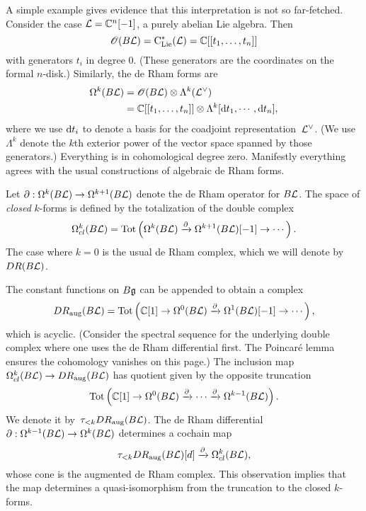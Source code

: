 \begin{eg}
A simple example gives evidence that this interpretation is not so far-fetched.
Consider the case $\mathcal L = \mathbb C^n [-1]$, a purely abelian Lie algebra.
Then
\[
\mathscr O(B \mathcal L) = {\rm C}_{{\rm Lie}}^*(\mathcal L) = \mathbb C[[t_1,\ldots,t_n]]
\]
with generators $t_i$ in degree 0.
(These generators are the coordinates on the formal $n$-disk.)
Similarly, the de Rham forms are
\begin{align*}
\Omega^k(B \mathcal L) 
&= \mathscr O(B \mathcal L)  \otimes \Lambda^k(\mathcal L^\vee) \\
 &=\mathbb C[[t_1,\ldots, t_n]] \otimes \Lambda^k[{\rm d} t_1, \cdots, {\rm d} t_n],
\end{align*}
where we use ${\rm d} t_i$ to denote a basis for the coadjoint representation~$\mathcal L^\vee$.
(We use $\Lambda^k$ denote the $k$th exterior power of the vector space spanned by those generators.)
Everything is in cohomological degree zero.
Manifestly everything agrees with the usual constructions of algebraic de Rham forms.
\end{eg}


Let $\partial : \Omega^{k}(B\mathcal L) \to \Omega^{k+1}(B\mathcal L)$ denote the de Rham operator for $B\mathcal L$. 
The space of {\em closed} $k$-forms is defined by the totalization of the double complex
\[
\Omega^{k}_{cl}(B \mathcal L) = {\rm Tot}\left( \Omega^k(B\mathcal L) \xrightarrow{\partial} \Omega^{k+1}(B \mathcal L)[-1] \to \cdots \right).
\]
The case where $k=0$ is the usual de Rham complex, which we will denote by~$DR(B\mathcal L)$.

The constant functions on $B\mathfrak g$ can be appended to obtain a complex
\[
DR_{\rm aug}(B\mathcal L) = {\rm Tot}\left( \mathbb C[1] \to \Omega^0(B\mathcal L) \xrightarrow{\partial} \Omega^{1}(B \mathcal L)[-1] \to \cdots \right),
\]
which is acyclic.
(Consider the spectral sequence for the underlying double complex where one uses the de Rham differential first. The Poincar\'e lemma ensures the cohomology vanishes on this page.)
The inclusion map $\Omega^{k}_{cl}(B \mathcal L) \to DR_{\rm aug}(B\mathcal L)$ has quotient given by the opposite truncation
\[
 {\rm Tot}\left( \mathbb C[1] \to \Omega^0(B\mathcal L) \xrightarrow{\partial} \cdots \xrightarrow{\partial} \Omega^{k-1}(B \mathcal L)\right).
\]
We denote it by~$\tau_{< k} DR_{\rm aug}(B \mathcal L)$. 
The de Rham differential $\partial: \Omega^{k-1}(B \mathcal L) \to \Omega^{k}(B \mathcal L)$ determines a cochain map
\[
\tau_{< k} DR_{\rm aug}(B \mathcal L)[d] \xrightarrow{\partial} \Omega^{k}_{cl}(B \mathcal L),
\]
whose cone is the augmented de Rham complex.
This observation implies that the map determines a quasi-isomorphism from the truncation to the closed $k$-forms.

